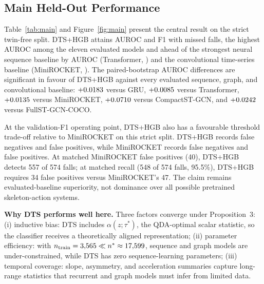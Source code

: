 \documentclass[letterpaper]{article}
\begin{document}
\subsection{Main Held-Out Performance}
Table~\ref{tab:main} and Figure~\ref{fig:main} present the central result on the strict twin-free split. DTS+HGB attains AUROC \DTSHGBauroc{} \DTSHGBaurocCI{} and F1 \DTSHGBf{} \DTSHGBfCI{} with \DTSHGBfn{} missed falls, the highest AUROC among the eleven evaluated models and ahead of the strongest neural sequence baseline by AUROC (Transformer, \Transformerauroc{} \TransformeraurocCI) and the convolutional time-series baseline (MiniROCKET, \MiniROCKETauroc{} \MiniROCKETaurocCI). The paired-bootstrap AUROC differences are significant in favour of DTS+HGB against every evaluated sequence, graph, and convolutional baseline: $+0.0183$ \hgbminusgruaurocCI{} versus GRU, $+0.0085$ \hgbminustransaurocCI{} versus Transformer, $+0.0135$ \hgbminusrocketaurocCI{} versus MiniROCKET, $+0.0710$ \hgbminusgcnaurocCI{} versus CompactST-GCN, and $+0.0242$ \hgbminusfullgcnaurocCI{} versus FullST-GCN-COCO.

At the validation-F1 operating point, DTS+HGB also has a favourable threshold trade-off relative to MiniROCKET on this strict split. DTS+HGB records \DTSHGBfn{} false negatives and \DTSHGBfp{} false positives, while MiniROCKET records \MiniROCKETfn{} false negatives and \MiniROCKETfp{} false positives. At matched MiniROCKET false positives (40), DTS+HGB detects 557 of 574 falls; at matched recall (548 of 574 falls, 95.5\%), DTS+HGB requires 34 false positives versus MiniROCKET's 47. The claim remains evaluated-baseline superiority, not dominance over all possible pretrained skeleton-action systems.

\textbf{Why DTS performs well here.} Three factors converge under Proposition~3: (i) inductive bias: DTS includes $\alpha(z;\tau^*)$, the QDA-optimal scalar statistic, so the classifier receives a theoretically aligned representation; (ii) parameter efficiency: with $n_{\mathrm{train}} = 3{,}565 \ll n^* \approx 17{,}599$, sequence and graph models are under-constrained, while DTS has zero sequence-learning parameters; (iii) temporal coverage: slope, asymmetry, and acceleration summaries capture long-range statistics that recurrent and graph models must infer from limited data.
\end{document}
